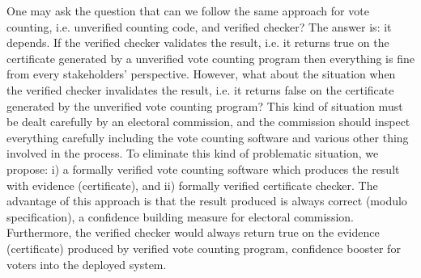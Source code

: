    One may ask the question that can we follow the same approach for vote counting,
   i.e. unverified counting code, and verified checker?  The answer is: it depends. 
   If the verified checker validates the result, i.e. it returns true on  
   the certificate generated by a unverified 
   vote counting program then everything is fine from every stakeholders' perspective.
   However, what about the situation when the verified checker invalidates the result, i.e. 
   it returns false on the certificate generated by the unverified vote counting program? 
   This kind of situation must be dealt carefully by an electoral commission, and the commission should
   inspect everything carefully including the vote counting software and various other thing involved in the
   process.
   To eliminate this kind of problematic situation, we propose: i) a formally verified vote counting
   software which produces the result with evidence (certificate), and ii) formally verified 
   certificate checker. The advantage of this approach is that the result produced is always correct (modulo 
   specification), a confidence building measure for electoral commission. Furthermore, the verified checker would 
   always return true on the evidence (certificate) produced by verified vote counting program, confidence booster for 
   voters into the deployed system.  
  

  
  

